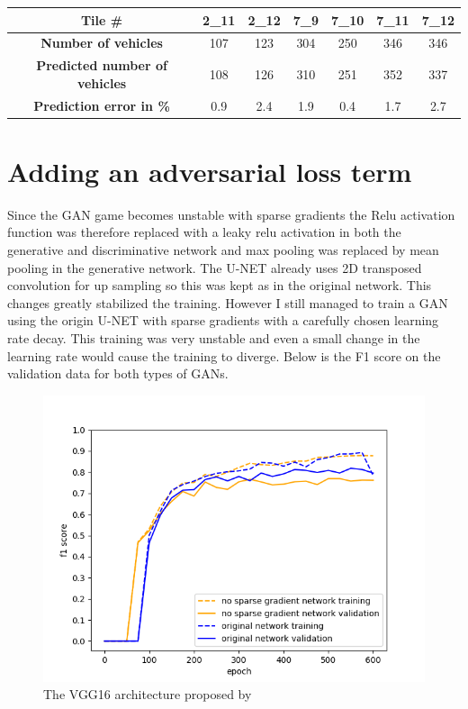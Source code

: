 \documentclass{kththesis}
\begin{document}
\begin{center}
\begin{tabular}{|c c c c c c c|}
\hline
\textbf{Tile \#} & 2\_11  & 2\_12 & 7\_9 & 7\_10 & 7\_11 & 7\_12 \\
\hline
\textbf{Number of vehicles} & 107 & 123 & 304 & 250 & 346 & 346 \\
\textbf{Predicted number of vehicles} & 108 & 126 & 310 & 251 & 352 & 337 \\
\textbf{Prediction error in \%} &0.9 &  2.4 & 1.9 & 0.4 & 1.7 & 2.7\\
\hline
\end{tabular}
\end{center}
\section{Adding an adversarial loss term}
Since the GAN game becomes unstable with sparse gradients the Relu activation function was therefore replaced with a leaky relu activation in both the generative and discriminative network and max pooling was replaced by mean pooling in the generative network. The U-NET already uses 2D transposed convolution for up sampling so this was kept as in the original network. This changes greatly stabilized the training. However I still managed to train a GAN using the origin U-NET with sparse gradients with a carefully chosen learning rate decay. This training was very unstable and even a small change in the learning rate would cause the training to diverge. Below is the F1 score on the validation data for both types of GANs.
\begin{center}
\begin{figure}[H]
      \includegraphics[scale=0.7]{mean_max_2}
  \caption{The VGG16 architecture proposed by \cite{simonyan_very_2014}} \label{fig:vgg}
\end{figure}
\end{center}
\end{document}
